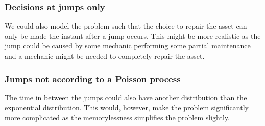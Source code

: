 \subsubsection{Decisions at jumps only}
We could also model the problem such that the choice to repair the asset can only be made the instant after a jump occurs.
This might be more realistic as the jump could be caused by some mechanic performing some partial maintenance and a mechanic might be needed to completely repair the asset.

\subsubsection{Jumps not according to a Poisson process}
The time in between the jumps could also have another distribution than the exponential distribution.
This would, however, make the problem significantly more complicated as the memorylessness simplifies the problem slightly.